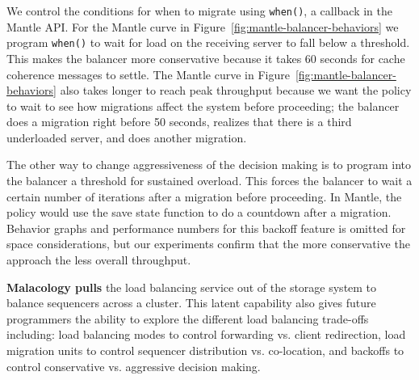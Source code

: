 We control the conditions for when to migrate using \texttt{when()}, a callback
in the Mantle API.  For the Mantle curve in
Figure~\ref{fig:mantle-balancer-behaviors} we program \texttt{when()} to wait
for load on the receiving server to fall below a threshold. This makes the
balancer more conservative because it takes 60 seconds for cache coherence
messages to settle.  The Mantle curve in
Figure~\ref{fig:mantle-balancer-behaviors} also takes longer to reach peak
throughput because we want the policy to wait to see how migrations affect the
system before proceeding; the balancer does a migration right before 50
seconds, realizes that there is a third underloaded server, and does another
migration. 

The other way to change aggressiveness of the decision making is to program
into the balancer a threshold for sustained overload. This forces the balancer
to wait a certain number of iterations after a migration before proceeding. In
Mantle, the policy would use the save state function to do a countdown after a
migration.  Behavior graphs and performance numbers for this backoff feature is
omitted for space considerations, but our experiments confirm that the more
conservative the approach the less overall throughput.
 
\textbf{Malacology pulls} the load balancing service out of the storage system
to balance sequencers across a cluster. This latent capability also gives
future programmers the ability to explore the different load balancing
trade-offs including: load balancing modes to control forwarding vs. client
redirection, load migration units to control sequencer distribution vs.
co-location, and backoffs to control conservative vs. aggressive decision
making.

%
%
%

